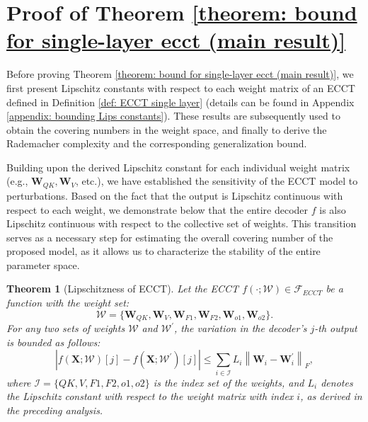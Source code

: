 \documentclass[lettersize,onecolumn]{IEEEtran}
\newtheorem{theorem}{Theorem}
\begin{document}
\appendices

\section{Proof of Theorem \ref{theorem: bound for single-layer ecct (main result)}}\label{appendix: proof of theorem 1}

Before proving Theorem \ref{theorem: bound for single-layer ecct (main result)}, we first present Lipschitz constants with respect to each weight matrix of an ECCT defined in Definition \ref{def: ECCT single layer} (details can be found in Appendix \ref{appendix: bounding Lips constants}). These results are subsequently used to obtain the covering numbers in the weight space, and finally to derive the Rademacher complexity and the corresponding generalization bound.

Building upon the derived Lipschitz constant for each individual weight matrix (e.g., $\mathbf{W}_{QK}, \mathbf{W}_{V}$, etc.),  we have established the sensitivity of the ECCT model to perturbations. Based on the fact that the output is Lipschitz continuous with respect to each weight, we demonstrate below that the entire decoder $f$ is also Lipschitz continuous with respect to the collective set of weights. This transition serves as a necessary step for estimating the overall covering number of the proposed model, as it allows us to characterize the stability of the entire parameter space.

\begin{theorem}[Lipschitzness of ECCT]\label{theorem: ECCT is Lipschitz continuous}
    Let the ECCT $f(\cdot;\mathcal{W}) \in \mathcal{F}_{ECCT}$ be a function with the weight set: $$\mathcal{W}=\{\mathbf{W}_{QK},\mathbf{W}_{V},\mathbf{W}_{F1},\mathbf{W}_{F2},\mathbf{W}_{o1},\mathbf{W}_{o2}\}.$$ For any two sets of weights $\mathcal{W}$ and $\mathcal{W}^{\prime}$, the variation in the decoder's $j$-th output is bounded as follows:
    \begin{equation}
        \left|f(\mathbf{X};\mathcal{W})[j]-f\left(\mathbf{X};\mathcal{W}^{\prime}\right)[j]\right| \leq \sum_{i \in \mathcal{I}} L_{i}\left\|\mathbf{W}_{i}-\mathbf{W}_{i}^{\prime}\right\|_{F},
        \label{eq: ECCT Lipschitz continuous}
    \end{equation}
    where $\mathcal{I}=\{Q K, V, F 1, F 2, o 1, o 2\}$ is the index set of the weights, and $L_{i}$ denotes the Lipschitz constant with respect to the weight matrix with index $i$, as derived in the preceding analysis.
\end{theorem}
\end{document}
